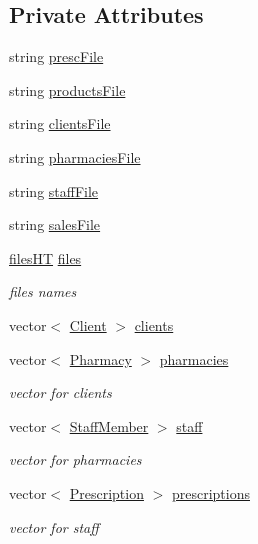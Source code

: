 \subsection*{Private Attributes}
\begin{DoxyCompactItemize}
\item 
string \hyperlink{classDataBase_a7649e7e3eda974285c99e78c23829334}{presc\+File}
\item 
string \hyperlink{classDataBase_a24acb8bdda9293336f40a4b08741235e}{products\+File}
\item 
string \hyperlink{classDataBase_a7b52741a2183b8b3eba86534d02782e6}{clients\+File}
\item 
string \hyperlink{classDataBase_aa52765a56e1fefddb5b1cf638de3493e}{pharmacies\+File}
\item 
string \hyperlink{classDataBase_a2f564a52132d74186314695a7a0e3270}{staff\+File}
\item 
string \hyperlink{classDataBase_a8b16f4814de788f12e96163255aaa737}{sales\+File}
\item 
\hyperlink{DataBase_8h_a309f0ca910338932f751c46c6e5ccbbc}{files\+HT} \hyperlink{classDataBase_a576f0eac012d39fffb1064a5ea27ad08}{files}
\begin{DoxyCompactList}\small\item\em files names \end{DoxyCompactList}\item 
vector$<$ \hyperlink{classClient}{Client} $>$ \hyperlink{classDataBase_aa5f93e5229c216c200681b551db2db77}{clients}
\item 
vector$<$ \hyperlink{classPharmacy}{Pharmacy} $>$ \hyperlink{classDataBase_ada5f113e22144b1b28775557e2a10f08}{pharmacies}
\begin{DoxyCompactList}\small\item\em vector for clients \end{DoxyCompactList}\item 
vector$<$ \hyperlink{classStaffMember}{Staff\+Member} $>$ \hyperlink{classDataBase_a74729cf98d5b60cc2bfbac6c0fa00229}{staff}
\begin{DoxyCompactList}\small\item\em vector for pharmacies \end{DoxyCompactList}\item 
vector$<$ \hyperlink{classPrescription}{Prescription} $>$ \hyperlink{classDataBase_a592b7e885d6708309c298406db68c505}{prescriptions}
\begin{DoxyCompactList}\small\item\em vector for staff \end{DoxyCompactList}\item 

\end{DoxyCompactItemize}
